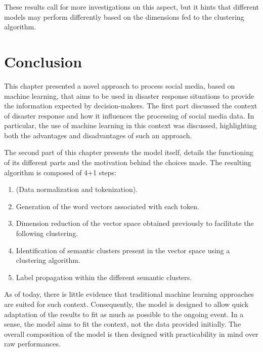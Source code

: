 These results call for more investigations on this aspect, but it hints that different models may perform differently based on the dimensions fed to the clustering algorithm.

\section*{Conclusion}
This chapter presented a novel approach to process social media, based on machine learning, that aims to be used in disaster response situations to provide the information expected by decision-makers.
The first part discussed the context of disaster response and how it influences the processing of social media data.
In particular, the use of machine learning in this context was discussed, highlighting both the advantages and disadvantages of such an approach.

The second part of this chapter presents the model itself, details the functioning of its different parts and the motivation behind the choices made.
The resulting algorithm is composed of 4+1 steps:

\begin{enumerate}
    \item (Data normalization and tokenization).
    \item Generation of the word vectors associated with each token.
    \item Dimension reduction of the vector space obtained previously to facilitate the following clustering.
    \item Identification of semantic clusters present in the vector space using a clustering algorithm.
    \item Label propagation within the different semantic clusters.
\end{enumerate}

As of today, there is little evidence that traditional machine learning approaches are suited for such context.
Consequently, the model is designed to allow quick adaptation of the results to fit as much as possible to the ongoing event.
In a sense, the model aims to fit the context, not the data provided initially.
The overall composition of the model is then designed with practicability in mind over raw performances.

